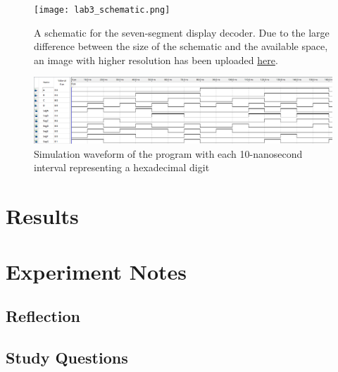 \documentclass[12pt]{article}
\begin{document}
\begin{figure}[h]
  \centering
  \texttt{[image: lab3\_schematic.png]}
  \caption{A schematic for the seven-segment display decoder. Due to the large difference between the size of the schematic and the available space, an image with higher resolution has been uploaded \href{https://i.imgur.com/jaLoZg9.jpg}{here}.}
  \label{figure:4}
\end{figure}

\begin{figure}[h]
  \centering
  \includegraphics[width=\textwidth]{lab3_simulation.png}
  \caption{Simulation waveform of the program with each 10-nanosecond interval representing a hexadecimal digit}
  \label{figure:5}
\end{figure}



\section{Results}

\section{Experiment Notes}

\subsection*{Reflection}

\subsection*{Study Questions}
\end{document}
